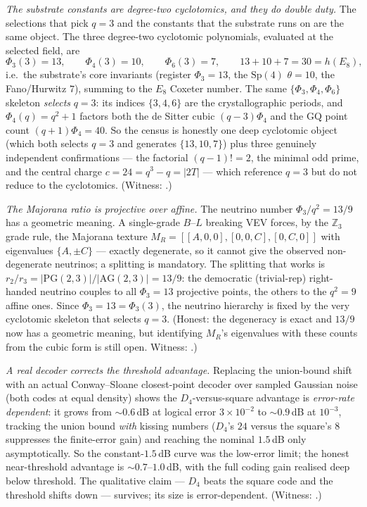 \documentclass[11pt]{article}
\begin{document}
\emph{The substrate constants are degree-two cyclotomics, and they do double duty.}
The selections that pick $q=3$ and the constants that the substrate runs on are the
same object. The three degree-two cyclotomic polynomials, evaluated at the selected
field, are
\[
\Phi_3(3)=13,\qquad \Phi_4(3)=10,\qquad \Phi_6(3)=7,\qquad 13+10+7=30=h(E_8),
\]
i.e.\ the substrate's core invariants (register $\Phi_3=13$, the $\mathrm{Sp}(4)$
$\theta=10$, the Fano/Hurwitz $7$), summing to the $E_8$ Coxeter number. The same
$\{\Phi_3,\Phi_4,\Phi_6\}$ skeleton \emph{selects} $q=3$: its indices $\{3,4,6\}$ are
the crystallographic periods, and $\Phi_4(q)=q^2+1$ factors both the de Sitter cubic
$(q-3)\Phi_4$ and the $\mathrm{GQ}$ point count $(q+1)\Phi_4=40$. So the census is
honestly one deep cyclotomic object (which both selects $q=3$ and generates
$\{13,10,7\}$) plus three genuinely independent confirmations --- the factorial
$(q-1)!=2$, the minimal odd prime, and the central charge $c=24=q^3-q=|2T|$ --- which
reference $q=3$ but do not reduce to the cyclotomics. (Witness:
.)

\emph{The Majorana ratio is projective over affine.} The neutrino number $\Phi_3/q^2=
13/9$ has a geometric meaning. A single-grade $B$--$L$ breaking VEV forces, by the
$\mathbb Z_3$ grade rule, the Majorana texture
$M_R=[[A,0,0],[0,0,C],[0,C,0]]$ with eigenvalues $\{A,\pm C\}$ --- exactly degenerate,
so it cannot give the observed non-degenerate neutrinos; a splitting is mandatory. The
splitting that works is $r_2/r_3=\lvert\mathrm{PG}(2,3)\rvert/\lvert\mathrm{AG}(2,3)
\rvert=13/9$: the democratic (trivial-rep) right-handed neutrino couples to all
$\Phi_3=13$ projective points, the others to the $q^2=9$ affine ones. Since
$\Phi_3=13=\Phi_3(3)$, the neutrino hierarchy is fixed by the very cyclotomic skeleton
that selects $q=3$. (Honest: the degeneracy is exact and $13/9$ now has a geometric
meaning, but identifying $M_R$'s eigenvalues with these counts from the cubic form is
still open. Witness: .)

\emph{A real decoder corrects the threshold advantage.} Replacing the union-bound
shift with an actual Conway--Sloane closest-point decoder over sampled Gaussian noise
(both codes at equal density) shows the $D_4$-versus-square advantage is
\emph{error-rate dependent}: it grows from $\sim0.6$\,dB at logical error $3\times
10^{-2}$ to $\sim0.9$\,dB at $10^{-3}$, tracking the union bound \emph{with} kissing
numbers ($D_4$'s $24$ versus the square's $8$ suppresses the finite-error gain) and
reaching the nominal $1.5$\,dB only asymptotically. So the constant-$1.5$\,dB curve was
the low-error limit; the honest near-threshold advantage is $\sim0.7$--$1.0$\,dB, with
the full coding gain realised deep below threshold. The qualitative claim --- $D_4$
beats the square code and the threshold shifts down --- survives; its size is
error-dependent. (Witness: .)
\end{document}
